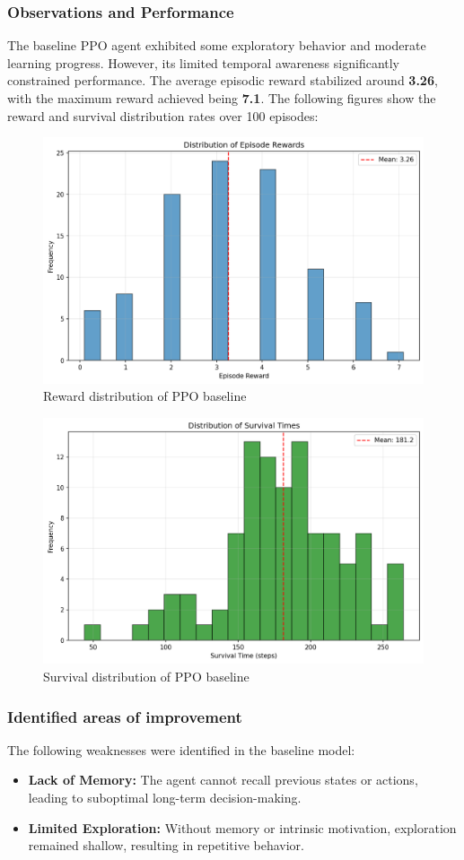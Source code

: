 \documentclass[twocolumn]{article}
\begin{document}
\subsubsection*{Observations and Performance}
The baseline PPO agent exhibited some exploratory behavior and moderate learning progress. However, its limited temporal awareness significantly constrained performance. The average episodic reward stabilized around \textbf{3.26}, with the maximum reward achieved being \textbf{7.1}.
The following figures show the reward and survival distribution rates over 100 episodes:
\begin{figure}[H]
    \centering
    \includegraphics[width=0.75\linewidth]{images/reward_distribution_ppo_baseline.png}
    \caption{Reward distribution of PPO baseline}
    \label{fig:placeholder}
\end{figure}
\begin{figure}[H]
    \centering
    \includegraphics[width=0.75\linewidth]{images/survival_distribution_ppo_baseline.png}
    \caption{Survival distribution of PPO baseline}
    \label{fig:placeholder}
\end{figure}
\subsubsection*{Identified areas of improvement}
The following weaknesses were identified in the baseline model:
\begin{itemize}
    \item \textbf{Lack of Memory:} The agent cannot recall previous states or actions, leading to suboptimal long-term decision-making.
    \item \textbf{Limited Exploration:} Without memory or intrinsic motivation, exploration remained shallow, resulting in repetitive behavior.
\end{itemize}
\end{document}
